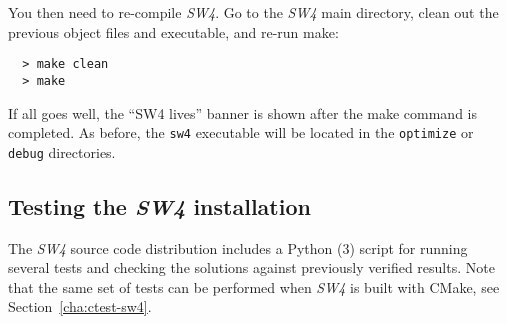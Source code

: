 \documentclass[11pt]{article}
\begin{document}
You then need to re-compile \emph{SW4}. Go to the \emph{SW4} main directory, clean out the previous
object files and executable, and re-run make:
\begin{verbatim}
  > make clean
  > make
\end{verbatim}
If all goes well, the ``SW4 lives'' banner is shown after the make command is
completed. As before, the \verb+sw4+ executable will be located in the \verb+optimize+ or
\verb+debug+ directories.

\subsection{Testing the \emph{SW4} installation}
The \emph{SW4} source code distribution includes a Python (3) script for running several tests and
checking the solutions against previously verified results. Note that the same set of tests can be
performed when \emph{SW4} is built with CMake, see Section~\ref{cha:ctest-sw4}.
\end{document}
